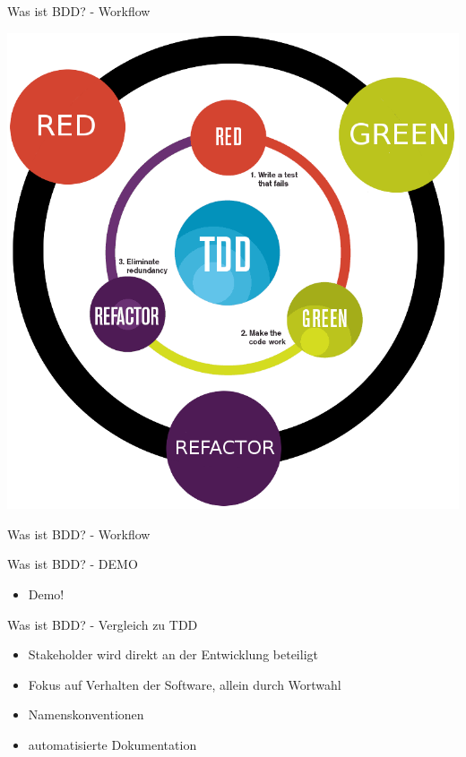 \documentclass{beamer}
\begin{document}
  \begin{frame}{Was ist BDD? - Workflow}
    \begin{center}
      \includegraphics[scale=0.25]{../doc/assets/bdd_flow.png}
    \end{center}
  \end{frame}

  \begin{frame}{Was ist BDD? - Workflow}
    
  \end{frame}

  \begin{frame}{Was ist BDD? - DEMO}
    \begin{itemize}
      \item Demo!
    \end{itemize}
  \end{frame}

  \begin{frame}{Was ist BDD? - Vergleich zu TDD}
    \begin{itemize}
      \item Stakeholder wird direkt an der Entwicklung beteiligt
      \item Fokus auf Verhalten der Software, allein durch Wortwahl
      \item Namenskonventionen
      \item automatisierte Dokumentation
    \end{itemize}
  \end{frame}
\end{document}
